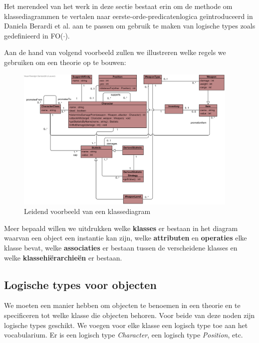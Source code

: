 Het merendeel van het werk in deze sectie bestaat erin om de methode om klassediagrammen te vertalen naar eerste-orde-predicatenlogica ge\"introduceerd in Daniela Berardi et al.\cite{BerardiDaniela2005RoUc} aan te passen om gebruik te maken van logische types zoals gedefinieerd in FO($\cdot$).

Aan de hand van volgend voorbeeld zullen we illustreren welke regels we gebruiken om een theorie op te bouwen:

\begin{figure}[h]
	\includegraphics[width=0.95\textwidth]{chap-consistentie/diagram-voorbeeld.png}
	\caption{Leidend voorbeeld van een klassediagram}
	\label{fig:diagram-voorbeeld}
\end{figure}

Meer bepaald willen we uitdrukken welke \textbf{klasses} er bestaan in het diagram waarvan een object een instantie kan zijn, welke \textbf{attributen} en \textbf{operaties} elke klasse bevat, welke \textbf{associaties} er bestaan tussen de verscheidene klasses en welke \textbf{klassehi\"erarchie\"en} er bestaan.

\subsection{Logische types voor objecten}
We moeten een manier hebben om objecten te benoemen in een theorie en te specificeren tot welke klasse die objecten behoren. Voor beide van deze noden zijn logische types geschikt. We voegen voor elke klasse een logisch type toe aan het vocabularium. Er is een logisch type \textit{Character}, een logisch type \textit{Position}, etc.

